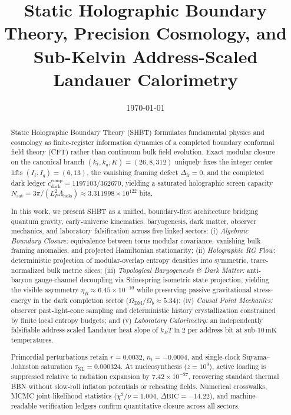 \documentclass[11pt,letterpaper]{article}
\title{Static Holographic Boundary Theory, Precision Cosmology, and\\
Sub-Kelvin Address-Scaled Landauer Calorimetry}
\author{\PaperAuthor}
\date{\today}
\theoremstyle{plain}
\begin{document}
\maketitle

\begin{abstract}
Static Holographic Boundary Theory (SHBT) formulates fundamental physics and cosmology as finite-register information dynamics of a completed boundary conformal field theory (CFT) rather than continuum bulk field evolution. Exact modular closure on the canonical branch $(k_\ell,k_q,K)=(26,8,312)$ uniquely fixes the integer center lifts $(I_\ell,I_q)=(6,13)$, the vanishing framing defect $\Delta_{\mathrm{fr}}=0$, and the completed dark ledger $c_{\mathrm{dark}}^{\mathrm{comp}}=1197103/362670$, yielding a saturated holographic screen capacity $N_{\mathrm{sat}}=3\pi/(L_P^2\Lambda_{\mathrm{holo}})\approx3.311998\times10^{122}$ bits.

In this work, we present SHBT as a unified, boundary-first architecture bridging quantum gravity, early-universe kinematics, baryogenesis, dark matter, observer mechanics, and laboratory falsification across five linked sectors:
(i) \emph{Algebraic Boundary Closure:} equivalence between torus modular covariance, vanishing bulk framing anomalies, and projected Hamiltonian stationarity;
(ii) \emph{Holographic RG Flow:} deterministic projection of modular-overlap entropy densities into symmetric, trace-normalized bulk metric slices;
(iii) \emph{Topological Baryogenesis \& Dark Matter:} anti-baryon gauge-channel decoupling via Stinespring isometric state projection, yielding the visible asymmetry $\eta_B\approx6.45\times10^{-10}$ while preserving passive gravitational stress-energy in the dark completion sector ($\Omega_{\mathrm{DM}}/\Omega_b\approx5.34$);
(iv) \emph{Causal Point Mechanics:} observer past-light-cone sampling and deterministic history crystallization constrained by finite local entropy budgets; and
(v) \emph{Laboratory Calorimetry:} an independently falsifiable address-scaled Landauer heat slope of $k_BT\ln2$ per address bit at sub-$10\,\mathrm{mK}$ temperatures.

Primordial perturbations retain $r=0.0032$, $n_t=-0.0004$, and single-clock Suyama--Johnston saturation $\tau_{\mathrm{NL}}=0.000324$. At nucleosynthesis ($z=10^9$), active loading is suppressed relative to radiation expansion by $7.42\times10^{-27}$, recovering standard thermal BBN without slow-roll inflaton potentials or reheating fields. Numerical crosswalks, MCMC joint-likelihood statistics ($\chi^2/\nu=1.004$, $\Delta\mathrm{BIC}=-14.22$), and machine-readable verification ledgers confirm quantitative closure across all sectors.
\end{abstract}
\end{document}
